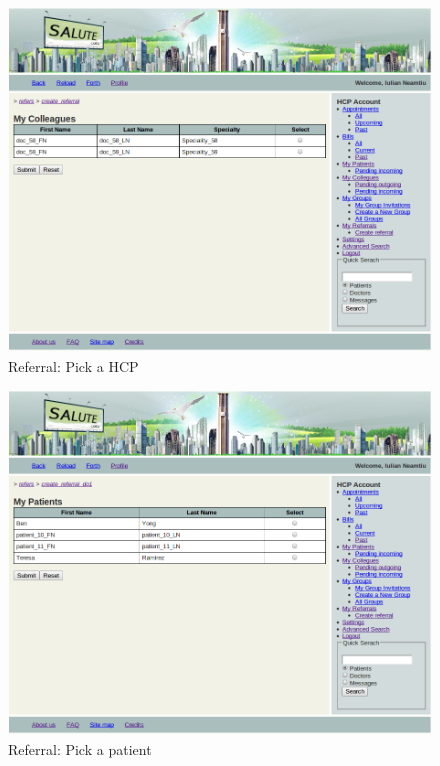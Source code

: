 \begin{figure}
\includegraphics[scale=0.5]{screenshots/referral_pick_my_collegues.png}
\caption{Referral: Pick a HCP}
\end{figure}

\begin{figure}
\includegraphics[scale=0.5]{screenshots/referrals_my_patients.png}
\caption{Referral: Pick a patient}
\end{figure}

